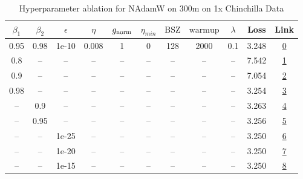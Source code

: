 \begin{table}[H]
\centering
\caption{Hyperparameter ablation for NAdamW on 300m on 1x Chinchilla Data}
\label{tab:ablation_nadamw_300m_on_1x_chinchilla_data}
\begin{tabular}{ccccccccccc}
\toprule
$\beta_1$ & $\beta_2$ & $\epsilon$ & $\eta$ & $g_{\mathrm{norm}}$ & $\eta_{min}$ & $\mathrm{BSZ}$ & $\mathrm{warmup}$ & $\lambda$ & Loss & Link \\
\midrule
0.95 & 0.98 & 1e-10 & 0.008 & 1 & 0 & 128 & 2000 & 0.1 & 3.248 & \href{https://wandb.ai/marin-community/optimizer-scaling/runs/sweep-300m-6B-nadamwf15cf6lr0.008-wd0.1-minlr0-warmup2000-b10.95-28ca3a}{0} \\
\midrule
0.8 & -- & -- & -- & -- & -- & -- & -- & -- & 7.542 & \href{https://wandb.ai/marin-community/optimizer-scaling/runs/sweep-300m-6B-nadamw0ba9cdlr0.008-wd0.1-minlr0-warmup2000-b10.8--70e8b0}{1} \\
0.9 & -- & -- & -- & -- & -- & -- & -- & -- & 7.054 & \href{https://wandb.ai/marin-community/optimizer-scaling/runs/sweep-300m-6B-nadamwacb766lr0.008-wd0.1-minlr0-warmup2000-b10.9--ff6a2e}{2} \\
0.98 & -- & -- & -- & -- & -- & -- & -- & -- & 3.254 & \href{https://wandb.ai/marin-community/optimizer-scaling/runs/sweep-300m-6B-nadamwd6541dlr0.008-wd0.1-minlr0-warmup2000-b10.98-84afaa}{3} \\
-- & 0.9 & -- & -- & -- & -- & -- & -- & -- & 3.263 & \href{https://wandb.ai/marin-community/optimizer-scaling/runs/sweep-300m-6B-nadamw6046ddlr0.008-wd0.1-minlr0-warmup2000-b10.95-127527}{4} \\
-- & 0.95 & -- & -- & -- & -- & -- & -- & -- & 3.256 & \href{https://wandb.ai/marin-community/optimizer-scaling/runs/sweep-300m-6B-nadamwc2a8e4lr0.008-wd0.1-minlr0-warmup2000-b10.95-3a5d38}{5} \\
-- & -- & 1e-25 & -- & -- & -- & -- & -- & -- & 3.250 & \href{https://wandb.ai/marin-community/optimizer-scaling/runs/sweep-300m-6B-nadamwb27e94lr0.008-wd0.1-minlr0-warmup2000-b10.95-4bf48d}{6} \\
-- & -- & 1e-20 & -- & -- & -- & -- & -- & -- & 3.250 & \href{https://wandb.ai/marin-community/optimizer-scaling/runs/sweep-300m-6B-nadamw43c706lr0.008-wd0.1-minlr0-warmup2000-b10.95-bf751b}{7} \\
-- & -- & 1e-15 & -- & -- & -- & -- & -- & -- & 3.250 & \href{https://wandb.ai/marin-community/optimizer-scaling/runs/sweep-300m-6B-nadamw770e16lr0.008-wd0.1-minlr0-warmup2000-b10.95-126b23}{8} \\

\end{tabular}
\end{table}
